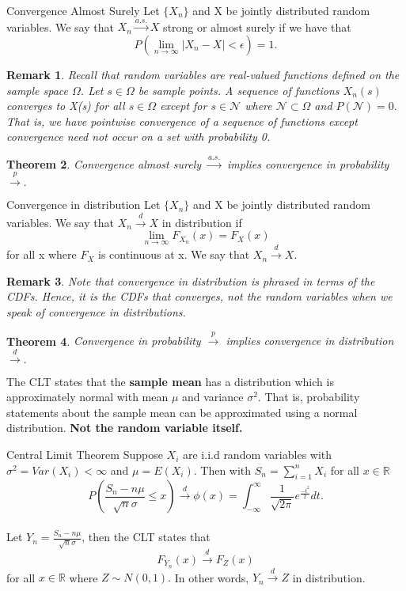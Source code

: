 \documentclass[twoside]{article}
\newcounter{lecnum}
\newtheorem{theorem}{Theorem}[lecnum]
\newtheorem{remark}[theorem]{Remark}
\begin{document}
\begin{definition_exam}{Convergence Almost Surely}{} Let $\{X_n\}$ and X be jointly distributed random variables. We say that $X_n \xrightarrow{a.s.} X$ strong or almost surely if we have that $$P(\lim_{n \rightarrow \infty}|X_n - X| < \epsilon) = 1.$$ 
\end{definition_exam}

\begin{remark}Recall that random variables are real-valued functions defined on the sample space $\Omega$. Let $s \in \Omega$ be sample points. A sequence of functions $X_n(s)$ converges to X(s) for all $s \in \Omega$ except for $s \in \mathcal{N}$ where $\mathcal{N} \subset \Omega$ and $P(\mathcal{N}) = 0.$ That is, we have pointwise convergence of a sequence of functions except convergence need not occur on a set with probability 0.
\end{remark}

\begin{theorem}Convergence almost surely $\xrightarrow{a.s.}$ implies convergence in probability $\xrightarrow{p}.$
\end{theorem}

\begin{definition_exam}{Convergence in distribution}{} Let $\{X_n\}$ and X be jointly distributed random variables. We say that $X_n \xrightarrow{d} X$ in distribution if 
$$\lim_{n \rightarrow \infty} F_{X_{n}}(x) = F_X(x)$$
 for all x where $F_X$ is continuous at x. We say that $X_n \xrightarrow{d} X.$
\end{definition_exam}

\begin{remark}Note that convergence in distribution is phrased in terms of the CDFs. Hence, it is the CDFs that converges, not the random variables when we speak of convergence in distributions.
\end{remark}

\begin{theorem}Convergence in probability $\xrightarrow{p}$ implies convergence in distribution $\xrightarrow{d}.$
\end{theorem}

The CLT states that the \textbf{sample mean} has a distribution which is approximately normal with mean $\mu$ and variance $\sigma^2.$ That is, probability statements about the sample mean can be approximated using a normal distribution. \textbf{Not the random variable itself.}
\begin{theorem_exam}{Central Limit Theorem}{} Suppose $X_i$ are i.i.d random variables with $\sigma^2 = Var(X_i) < \infty$ and $\mu = E(X_i)$. Then with $S_n = \sum_{i=1}^{n}X_i$ for all $x \in \mathbb{R}$
$$
P(\frac{S_n - n\mu}{\sqrt{n}\sigma} \leq x)  \xrightarrow{d} \phi(x) = \int_{-\infty}^{\infty}\frac{1}{\sqrt{2\pi}}e^{\frac{-t^2}{2}}dt.
$$ \\ Let $Y_n = \frac{S_n - n\mu}{\sqrt{n}\sigma}$, then the CLT states that 
$$
F_{Y_{n}}(x) \xrightarrow{d} F_Z(x)
$$
for all $x \in \mathbb{R}$ where $Z \sim N(0,1).$ In other words, $Y_n \xrightarrow{d} Z$ in distribution.
\end{theorem_exam}
\end{document}

